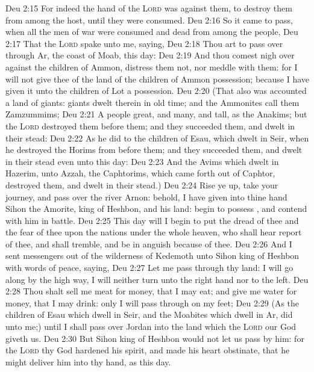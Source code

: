 \vs Deu 2:15 For indeed the hand of the \textsc{Lord} was against them, to destroy them from among the host, until they were consumed.
\vs Deu 2:16 So it came to pass, when all the men of war were consumed and dead from among the people,
\vs Deu 2:17 That the \textsc{Lord} spake unto me, saying,
\vs Deu 2:18 Thou art to pass over through Ar, the coast of Moab, this day:
\vs Deu 2:19 And  thou comest nigh over against the children of Ammon, distress them not, nor meddle with them: for I will not give thee of the land of the children of Ammon  possession; because I have given it unto the children of Lot  a possession.
\vs Deu 2:20 (That also was accounted a land of giants: giants dwelt therein in old time; and the Ammonites call them Zamzummims;
\vs Deu 2:21 A people great, and many, and tall, as the Anakims; but the \textsc{Lord} destroyed them before them; and they succeeded them, and dwelt in their stead:
\vs Deu 2:22 As he did to the children of Esau, which dwelt in Seir, when he destroyed the Horims from before them; and they succeeded them, and dwelt in their stead even unto this day:
\vs Deu 2:23 And the Avims which dwelt in Hazerim,  unto Azzah, the Caphtorims, which came forth out of Caphtor, destroyed them, and dwelt in their stead.)
\vs Deu 2:24 Rise ye up, take your journey, and pass over the river Arnon: behold, I have given into thine hand Sihon the Amorite, king of Heshbon, and his land: begin to possess , and contend with him in battle.
\vs Deu 2:25 This day will I begin to put the dread of thee and the fear of thee upon the nations  under the whole heaven, who shall hear report of thee, and shall tremble, and be in anguish because of thee.
\vs Deu 2:26 And I sent messengers out of the wilderness of Kedemoth unto Sihon king of Heshbon with words of peace, saying,
\vs Deu 2:27 Let me pass through thy land: I will go along by the high way, I will neither turn unto the right hand nor to the left.
\vs Deu 2:28 Thou shalt sell me meat for money, that I may eat; and give me water for money, that I may drink: only I will pass through on my feet;
\vs Deu 2:29 (As the children of Esau which dwell in Seir, and the Moabites which dwell in Ar, did unto me;) until I shall pass over Jordan into the land which the \textsc{Lord} our God giveth us.
\vs Deu 2:30 But Sihon king of Heshbon would not let us pass by him: for the \textsc{Lord} thy God hardened his spirit, and made his heart obstinate, that he might deliver him into thy hand, as  this day.

